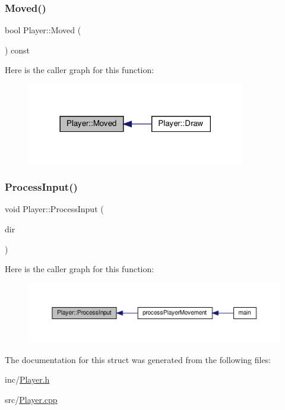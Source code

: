 \subsubsection{\texorpdfstring{Moved()}{Moved()}}
{\footnotesize\ttfamily bool Player\+::\+Moved (\begin{DoxyParamCaption}{ }\end{DoxyParamCaption}) const}

Here is the caller graph for this function\+:\nopagebreak
\begin{figure}[H]
\begin{center}
\leavevmode
\includegraphics[width=270pt]{structPlayer_a743da3dcbc81ed11bfcb81943aae175b_icgraph}
\end{center}
\end{figure}
\mbox{\label{structPlayer_a4b275c51f881fb61b52d1ede3d1dcba3}} 
\subsubsection{\texorpdfstring{Process\+Input()}{ProcessInput()}}
{\footnotesize\ttfamily void Player\+::\+Process\+Input (\begin{DoxyParamCaption}\item[{\hyperlink{Player_8h_aa91f5cffa9b1b82e96c8824b1fe5c61f}{Movement\+Dir}}]{dir }\end{DoxyParamCaption})}

Here is the caller graph for this function\+:\nopagebreak
\begin{figure}[H]
\begin{center}
\leavevmode
\includegraphics[width=350pt]{structPlayer_a4b275c51f881fb61b52d1ede3d1dcba3_icgraph}
\end{center}
\end{figure}


The documentation for this struct was generated from the following files\+:\begin{DoxyCompactItemize}
\item 
inc/\hyperlink{Player_8h}{Player.\+h}\item 
src/\hyperlink{Player_8cpp}{Player.\+cpp}\end{DoxyCompactItemize}
